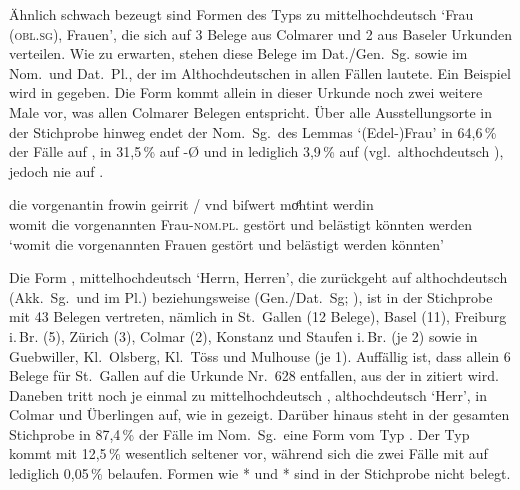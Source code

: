 Ähnlich schwach bezeugt sind Formen des Typs  zu mittelhochdeutsch
 `Frau (\textsc{obl.sg}), Frauen', die sich auf 3 Belege aus
Colmarer und 2 aus Baseler Urkunden verteilen. Wie zu erwarten, stehen diese
Belege im Dat./Gen.~Sg. sowie im Nom.\ und Dat.~Pl., der im
Althochdeutschen in allen Fällen  lautete. Ein
Beispiel wird in  gegeben. Die Form kommt allein in dieser
Urkunde noch zwei weitere Male vor, was allen Colmarer Belegen entspricht. Über
alle Ausstellungsorte in der Stichprobe hinweg endet der Nom.~Sg.\ des Lemmas
 `(Edel-)Frau' in 64,6\,\% der Fälle auf , in 31,5\,\% auf
-Ø und in lediglich 3,9\,\% auf  (vgl.~althochdeutsch ),
jedoch nie auf .

\begin{exe}
\ex\label{ex:col_vrouwin}
	 die vorgenantin frowin geirrit / vnd biſwert moͤhtint
			werdin \\
		womit die vorgenannten Frau-\textsc{nom.pl.\FemF} gestört {} und
			belästigt könnten werden \\
	\trans `womit die vorgenannten Frauen gestört und belästigt werden
		könnten'
		\parencites(Nr.~3293, Colmar, 1299)[446,24]{cao4}
\end{exe}

Die Form , mittelhochdeutsch  `Herrn, Herren', die
zurückgeht auf althochdeutsch  (Akk.~Sg.\ und im Pl.)
beziehungsweise  (Gen./Dat.~Sg;
\cite[vgl.][282--283]{braune2018}), ist in der Stichprobe mit 43 Belegen
vertreten, nämlich in St.~Gallen (12 Belege), Basel (11), Freiburg i.\,Br. (5),
Zürich (3), Colmar (2), Konstanz und Staufen i.\,Br. (je 2) sowie in
Guebwiller, Kl.~Olsberg, Kl.~Töss und Mulhouse (je 1). Auffällig ist, dass
allein 6 Belege für St.~Gallen auf die Urkunde Nr.~628
\autocite[55,35--57,7]{cao2} entfallen, aus der in  zitiert
wird. Daneben tritt noch je einmal  zu mittelhochdeutsch
, althochdeutsch  `Herr', in Colmar und Überlingen auf,
wie in  gezeigt. Darüber hinaus steht in der gesamten
Stichprobe in 87,4\,\% der Fälle im Nom.~Sg.\ eine Form vom Typ . Der
Typ  kommt mit 12,5\,\% wesentlich seltener vor, während sich die
zwei Fälle mit  auf lediglich 0,05\,\% belaufen. Formen wie
* und * sind in der Stichprobe nicht belegt.

